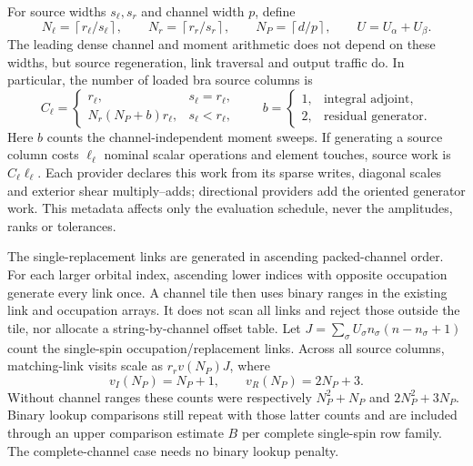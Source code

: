 \documentclass[11pt,a4paper]{article}
\begin{document}
For source widths $s_\ell,s_r$ and channel width $p$, define
\begin{equation}
 N_\ell=\left\lceil r_\ell/s_\ell\right\rceil,\qquad
 N_r=\left\lceil r_r/s_r\right\rceil,\qquad
 N_P=\left\lceil d/p\right\rceil,\qquad U=U_\alpha+U_\beta.
\end{equation}
The leading dense channel and moment arithmetic does not depend on these
widths, but source regeneration, link traversal and output traffic do.
In particular, the number of loaded bra source columns is
\begin{equation}
 C_\ell=\begin{cases}
 r_\ell,&s_\ell=r_\ell,\\
 N_r(N_P+b)r_\ell,&s_\ell<r_\ell,
 \end{cases}\qquad
 b=\begin{cases}1,&\text{integral adjoint},\\2,&\text{residual generator}.
 \end{cases}
\end{equation}
Here $b$ counts the channel-independent moment sweeps. If generating a
source column costs $\ell_\ell$ nominal scalar operations and element
touches, source work is $C_\ell\ell_\ell$. Each provider declares this work
from its sparse writes, diagonal scales and exterior shear multiply--adds;
directional providers add the oriented generator work. This metadata affects
only the evaluation schedule, never the amplitudes, ranks or tolerances.

The single-replacement links are generated in ascending packed-channel
order. For each larger orbital index, ascending lower indices with opposite
occupation generate every link once. A channel tile then uses binary ranges
in the existing link and occupation arrays. It does not scan all links and
reject those outside the tile, nor allocate a string-by-channel offset table.
Let $J=\sum_\sigma U_\sigma n_\sigma(n-n_\sigma+1)$ count the single-spin
occupation/replacement links. Across all source columns, matching-link visits
scale as $r_rv(N_P)J$, where
\begin{equation}
 v_I(N_P)=N_P+1,\qquad v_R(N_P)=2N_P+3.
\end{equation}
Without channel ranges these counts were respectively $N_P^2+N_P$ and
$2N_P^2+3N_P$. Binary lookup comparisons still repeat with those latter
counts and are included through an upper comparison estimate $B$ per
complete single-spin row family. The complete-channel case needs no binary
lookup penalty.
\end{document}
